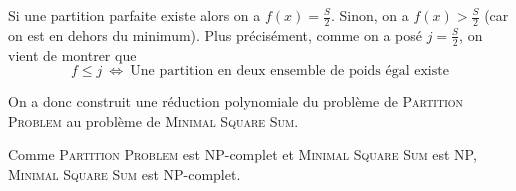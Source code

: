 {\begin{td-sol}[]
		Si une partition parfaite existe alors on a \(f(x) = \frac{S}{2}\). Sinon, on a \(f(x) > \frac{S}{2}\) (car on est en dehors du minimum).
		Plus précisément, comme on a posé \(j = \frac{S}{2}\), on vient de montrer que 
		\begin{equation*}
			f \leq j \ \iff \ \text{Une partition en deux ensemble de poids égal existe}
		\end{equation*}

		On a donc construit une réduction polynomiale du problème de \textsc{Partition Problem} au problème de \textsc{Minimal Square Sum}.

		Comme \textsc{Partition Problem} est NP-complet et \textsc{Minimal Square Sum} est NP, \textsc{Minimal Square Sum} est NP-complet.
	\end{td-sol}
}{}
